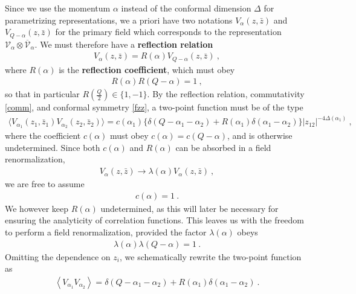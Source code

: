 \documentclass[12pt, a4paper, notitlepage, twoside]{report}
\numberwithin{equation}{section}
\theoremstyle{break}
\begin{document}
Since we
use the momentum $\alpha$ instead of the conformal dimension $\Delta$ for parametrizing representations, we a priori have two notations $V_\alpha(z,\bar{z})$ and $V_{Q-\alpha}(z,\bar{z})$ for the primary field which corresponds to the representation $\mathcal{V}_\alpha \otimes \overline{\mathcal{V}}_\alpha$.
We must therefore have a \textbf{\boldmath reflection relation}
\begin{align}
 \boxed{V_\alpha(z,\bar{z})= R(\alpha) V_{Q-\alpha}(z,\bar{z})}\ ,
\label{vrv}
\end{align}
where $R(\alpha)$ is the \textbf{\boldmath reflection coefficient}, which must obey 
\begin{align}
 R(\alpha)R(Q-\alpha)=1\ ,
\label{rrr}
\end{align}
so that in particular $R(\frac{Q}{2})\in\{1, -1\}$.
By the reflection relation, commutativity \eqref{comm}, and conformal symmetry \eqref{fzz}, a two-point function must be of the type 
\begin{align}
 \Big\langle V_{\alpha_1}(z_1,\bar{z}_1) V_{\alpha_2}(z_2,\bar{z}_2)\Big\rangle = c(\alpha_1) \Big\{ \delta(Q-\alpha_1-\alpha_2) + R(\alpha_1)\delta(\alpha_1-\alpha_2)\Big\} |z_{12}|^{-4\Delta(\alpha_1)}\ , 
\label{vvc}
\end{align}
where the coefficient $c(\alpha)$ must obey $c(\alpha)=c(Q-\alpha)$, and is otherwise undetermined.
Since both $c(\alpha)$ and $R(\alpha)$ can be absorbed in a field renormalization, 
\begin{align}
 V_\alpha(z,\bar{z}) \to \lambda(\alpha)  V_\alpha(z,\bar{z}) \ ,
\label{vlv}
\end{align}
we are free to assume
\begin{align}
 c(\alpha)=1\ .
\end{align}
We however keep $R(\alpha)$ undetermined, as this will later be necessary for ensuring the analyticity of correlation functions.
This leaves us with the freedom to perform a field renormalization, provided the factor $\lambda(\alpha)$ obeys
\begin{align}
 \lambda(\alpha)\lambda(Q-\alpha) = 1\ .
\label{llo}
\end{align}
Omitting the dependence on $z_i$, we schematically rewrite the two-point function as 
\begin{align}
 \boxed{\left\langle V_{\alpha_1}V_{\alpha_2} \right\rangle = \delta(Q-\alpha_1-\alpha_2) + R(\alpha_1)\delta(\alpha_1-\alpha_2) }\ .
\label{vvss}
\end{align}
\end{document}
